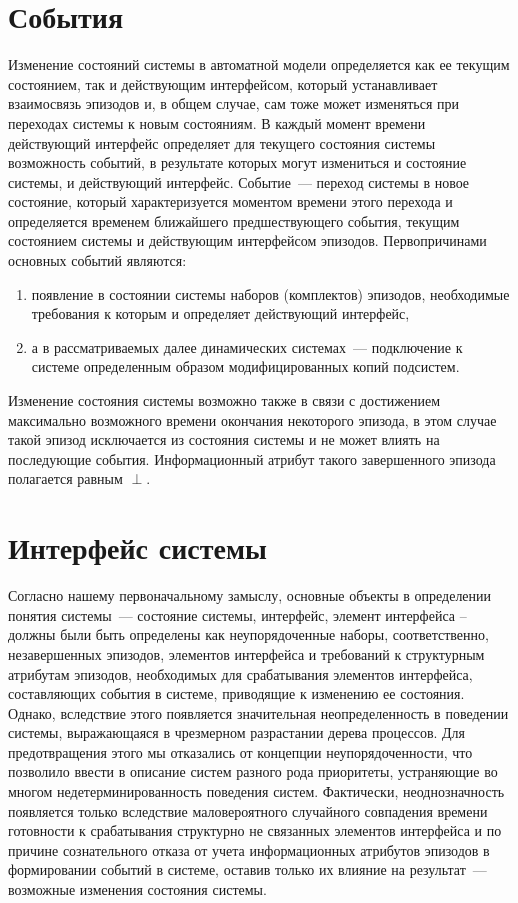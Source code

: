 \section{События}

Изменение состояний системы в автоматной модели определяется как ее текущим состоянием, так и действующим интерфейсом, который устанавливает взаимосвязь эпизодов и, в общем случае, сам тоже может изменяться при переходах системы к новым состояниям. В каждый момент времени действующий интерфейс определяет для текущего состояния системы возможность событий, в результате которых могут измениться и состояние системы, и действующий интерфейс. 
Событие~--- переход системы в новое состояние, который характеризуется моментом времени этого перехода и определяется временем ближайшего предшествующего события, текущим состоянием системы и действующим интерфейсом эпизодов. 
Первопричинами основных событий являются: 
\begin{enumerate}
	\item появление в состоянии системы наборов (комплектов) эпизодов, необходимые требования к которым и определяет действующий интерфейс, 
	\item  а в рассматриваемых далее динамических системах~--- подключение к системе определенным образом модифицированных копий подсистем. 
\end{enumerate}
Изменение состояния системы возможно также в связи с достижением максимально возможного времени окончания некоторого эпизода, в этом случае такой эпизод исключается из состояния системы и не может влиять на последующие события. 
Информационный атрибут такого завершенного эпизода полагается равным $ \perp $.

\section{Интерфейс системы}
Согласно нашему первоначальному замыслу, основные объекты в определении понятия системы~--- состояние системы, интерфейс, элемент интерфейса – должны были быть определены как неупорядоченные наборы, соответственно, незавершенных эпизодов, элементов интерфейса и требований к структурным атрибутам эпизодов, необходимых для срабатывания элементов интерфейса, составляющих события в системе, приводящие к изменению ее состояния. 
Однако, вследствие этого появляется значительная неопределенность в поведении системы, выражающаяся в чрезмерном разрастании дерева процессов. Для предотвращения этого мы отказались от концепции неупорядоченности, что позволило ввести в описание систем разного рода приоритеты, устраняющие во многом недетерминированность поведения систем. 
Фактически, неоднозначность появляется только вследствие маловероятного случайного совпадения времени готовности к срабатывания структурно не связанных элементов интерфейса и по причине сознательного отказа от учета информационных атрибутов эпизодов в формировании событий в системе, оставив только их влияние на результат~--- возможные изменения состояния системы.

